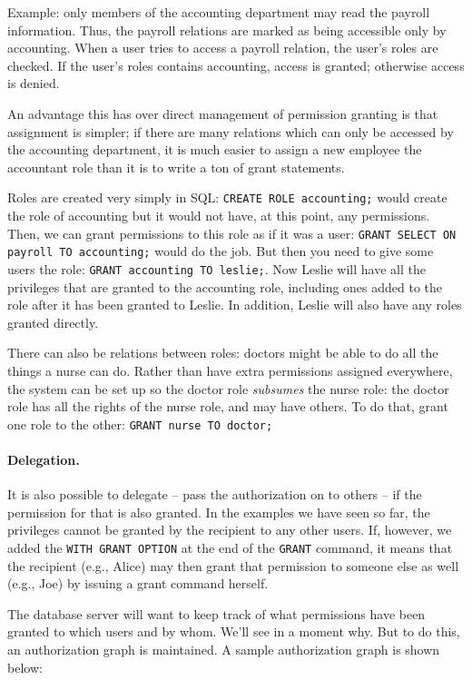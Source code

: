 Example: only members of the accounting department may read the payroll information. Thus, the payroll relations are marked as being accessible only by accounting. When a user tries to access a payroll relation, the user's roles are checked. If the user's roles contains accounting, access is granted; otherwise access is denied.

An advantage this has over direct management of permission granting is that assignment is simpler; if there are many relations which can only be accessed by the accounting department, it is much easier to assign a new employee the accountant role than it is to write a ton of grant statements.

Roles are created very simply in SQL: \texttt{CREATE ROLE accounting;} would create the role of accounting but it would not have, at this point, any permissions. Then, we can grant permissions to this role as if it was a user: \texttt{GRANT SELECT ON payroll TO accounting;} would do the job. But then you need to give some users the role: \texttt{GRANT accounting TO leslie;}. Now Leslie will have all the privileges that are granted to the accounting role, including ones added to the role after it has been granted to Leslie. In addition, Leslie will also have any roles granted directly. 

There can also be relations between roles: doctors might be able to do all the things a nurse can do. Rather than have extra permissions assigned everywhere, the system can be set up so the doctor role \textit{subsumes} the nurse role: the doctor role has all the rights of the nurse role, and may have others. To do that, grant one role to the other: \texttt{GRANT nurse TO doctor;}

\paragraph{Delegation.}
It is also possible to delegate -- pass the authorization on to others -- if the permission for that is also granted. In the examples we have seen so far, the privileges cannot be granted by the recipient to any other users. If, however, we added the \texttt{WITH GRANT OPTION} at the end of the \texttt{GRANT} command, it means that the recipient (e.g., Alice) may then grant that permission to someone else as well (e.g., Joe) by issuing a grant command herself.

The database server will want to keep track of what permissions have been granted to which users and by whom. We'll see in a moment why. But to do this, an authorization graph is maintained. A sample authorization graph is shown below:

